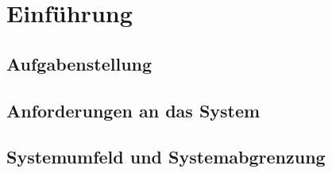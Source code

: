 \chapter{Einführung}
\label{ch:introduction}
\section{Aufgabenstellung}
\label{sec:aufgabenstellung}
\section{Anforderungen an das System}
\label{sec:anforderungen}
\section{Systemumfeld und Systemabgrenzung}
\label{sec:sysumfeld}
